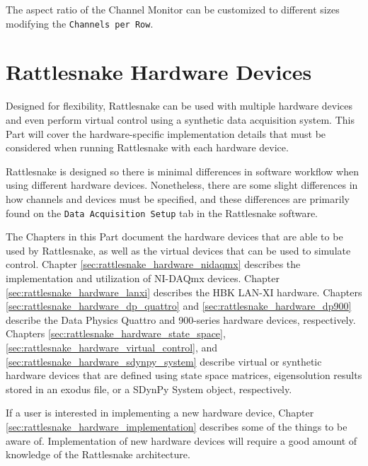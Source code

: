 \documentclass[pdf,12pt,report]{SANDreport}
\newcommand{\inlineCode}{\lstinline[basicstyle=\bfseries\ttfamily]}
\begin{document}
    The aspect ratio of the Channel Monitor can be customized to different sizes modifying the \inlineCode{Channels per Row}.

    \part{Rattlesnake Hardware Devices}\label{sec:rattlesnake_hardware}

    
    Designed for flexibility, Rattlesnake can be used with multiple hardware devices and even perform virtual control using a synthetic data acquisition system.  This Part will cover the hardware-specific implementation details that must be considered when running Rattlesnake with each hardware device.
    
    Rattlesnake is designed so there is minimal differences in software workflow when using different hardware devices.  Nonetheless, there are some slight differences in how channels and devices must be specified, and these differences are primarily found on the \inlineCode{Data Acquisition Setup} tab in the Rattlesnake software.
    
    The Chapters in this Part document the hardware devices that are able to be used by Rattlesnake, as well as the virtual devices that can be used to simulate control.  Chapter \ref{sec:rattlesnake_hardware_nidaqmx} describes the implementation and utilization of NI-DAQmx devices.  Chapter \ref{sec:rattlesnake_hardware_lanxi} describes the HBK LAN-XI hardware.  Chapters \ref{sec:rattlesnake_hardware_dp_quattro} and \ref{sec:rattlesnake_hardware_dp900} describe the Data Physics Quattro and 900-series hardware devices, respectively.  Chapters \ref{sec:rattlesnake_hardware_state_space}, \ref{sec:rattlesnake_hardware_virtual_control}, and \ref{sec:rattlesnake_hardware_sdynpy_system} describe virtual or synthetic hardware devices that are defined using state space matrices, eigensolution results stored in an exodus file, or a SDynPy System object, respectively.
    
    If a user is interested in implementing a new hardware device, Chapter \ref{sec:rattlesnake_hardware_implementation} describes some of the things to be aware of.  Implementation of new hardware devices will require a good amount of knowledge of the Rattlesnake architecture.
    
\end{document}
